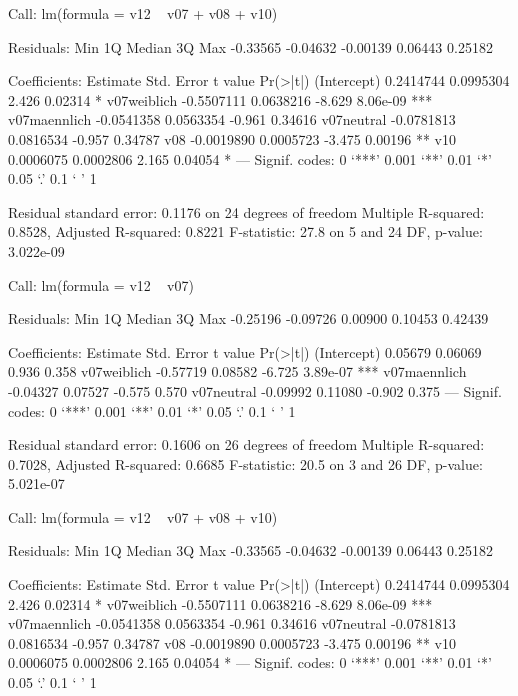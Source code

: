 \begin{Schunk}
\begin{Soutput}
Call:
lm(formula = v12 ~ v07 + v08 + v10)

Residuals:
     Min       1Q   Median       3Q      Max 
-0.33565 -0.04632 -0.00139  0.06443  0.25182 

Coefficients:
               Estimate Std. Error t value Pr(>|t|)    
(Intercept)   0.2414744  0.0995304   2.426  0.02314 *  
v07weiblich  -0.5507111  0.0638216  -8.629 8.06e-09 ***
v07maennlich -0.0541358  0.0563354  -0.961  0.34616    
v07neutral   -0.0781813  0.0816534  -0.957  0.34787    
v08          -0.0019890  0.0005723  -3.475  0.00196 ** 
v10           0.0006075  0.0002806   2.165  0.04054 *  
---
Signif. codes:  0 ‘***’ 0.001 ‘**’ 0.01 ‘*’ 0.05 ‘.’ 0.1 ‘ ’ 1 

Residual standard error: 0.1176 on 24 degrees of freedom
Multiple R-squared: 0.8528,	Adjusted R-squared: 0.8221 
F-statistic:  27.8 on 5 and 24 DF,  p-value: 3.022e-09 
\end{Soutput}
\begin{Soutput}
Call:
lm(formula = v12 ~ v07)

Residuals:
     Min       1Q   Median       3Q      Max 
-0.25196 -0.09726  0.00900  0.10453  0.42439 

Coefficients:
             Estimate Std. Error t value Pr(>|t|)    
(Intercept)   0.05679    0.06069   0.936    0.358    
v07weiblich  -0.57719    0.08582  -6.725 3.89e-07 ***
v07maennlich -0.04327    0.07527  -0.575    0.570    
v07neutral   -0.09992    0.11080  -0.902    0.375    
---
Signif. codes:  0 ‘***’ 0.001 ‘**’ 0.01 ‘*’ 0.05 ‘.’ 0.1 ‘ ’ 1 

Residual standard error: 0.1606 on 26 degrees of freedom
Multiple R-squared: 0.7028,	Adjusted R-squared: 0.6685 
F-statistic:  20.5 on 3 and 26 DF,  p-value: 5.021e-07 
\end{Soutput}
\begin{Soutput}
Call:
lm(formula = v12 ~ v07 + v08 + v10)

Residuals:
     Min       1Q   Median       3Q      Max 
-0.33565 -0.04632 -0.00139  0.06443  0.25182 

Coefficients:
               Estimate Std. Error t value Pr(>|t|)    
(Intercept)   0.2414744  0.0995304   2.426  0.02314 *  
v07weiblich  -0.5507111  0.0638216  -8.629 8.06e-09 ***
v07maennlich -0.0541358  0.0563354  -0.961  0.34616    
v07neutral   -0.0781813  0.0816534  -0.957  0.34787    
v08          -0.0019890  0.0005723  -3.475  0.00196 ** 
v10           0.0006075  0.0002806   2.165  0.04054 *  
---
Signif. codes:  0 ‘***’ 0.001 ‘**’ 0.01 ‘*’ 0.05 ‘.’ 0.1 ‘ ’ 1 


\end{Soutput}
\end{Schunk}
